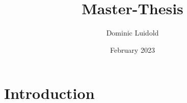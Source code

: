 \documentclass{article}
\title{Master-Thesis}
\author{Dominic Luidold}
\date{February 2023}
\begin{document}
\maketitle

\section{Introduction}
\end{document}
